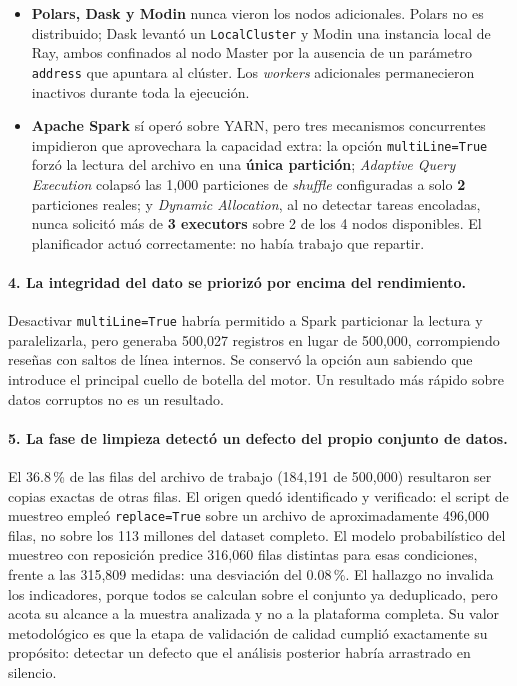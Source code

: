 \begin{itemize}[leftmargin=*]
    \item \textbf{Polars, Dask y Modin} nunca vieron los nodos adicionales. Polars no es distribuido; Dask levantó un \texttt{LocalCluster} y Modin una instancia local de Ray, ambos confinados al nodo Master por la ausencia de un parámetro \texttt{address} que apuntara al clúster. Los \textit{workers} adicionales permanecieron inactivos durante toda la ejecución.
    \item \textbf{Apache Spark} sí operó sobre YARN, pero tres mecanismos concurrentes impidieron que aprovechara la capacidad extra: la opción \texttt{multiLine=True} forzó la lectura del archivo en una \textbf{única partición}; \textit{Adaptive Query Execution} colapsó las 1,000 particiones de \textit{shuffle} configuradas a solo \textbf{2} particiones reales; y \textit{Dynamic Allocation}, al no detectar tareas encoladas, nunca solicitó más de \textbf{3 executors} sobre 2 de los 4 nodos disponibles. El planificador actuó correctamente: no había trabajo que repartir.
\end{itemize}

\paragraph{4. La integridad del dato se priorizó por encima del rendimiento.} Desactivar \texttt{multiLine=True} habría permitido a Spark particionar la lectura y paralelizarla, pero generaba 500,027 registros en lugar de 500,000, corrompiendo reseñas con saltos de línea internos. Se conservó la opción aun sabiendo que introduce el principal cuello de botella del motor. Un resultado más rápido sobre datos corruptos no es un resultado.

\paragraph{5. La fase de limpieza detectó un defecto del propio conjunto de datos.} El 36.8\,\% de las filas del archivo de trabajo (184,191 de 500,000) resultaron ser copias exactas de otras filas. El origen quedó identificado y verificado: el script de muestreo empleó \texttt{replace=True} sobre un archivo de aproximadamente 496,000 filas, no sobre los 113 millones del dataset completo. El modelo probabilístico del muestreo con reposición predice 316,060 filas distintas para esas condiciones, frente a las 315,809 medidas: una desviación del 0.08\,\%. El hallazgo no invalida los indicadores, porque todos se calculan sobre el conjunto ya deduplicado, pero acota su alcance a la muestra analizada y no a la plataforma completa. Su valor metodológico es que la etapa de validación de calidad cumplió exactamente su propósito: detectar un defecto que el análisis posterior habría arrastrado en silencio.

